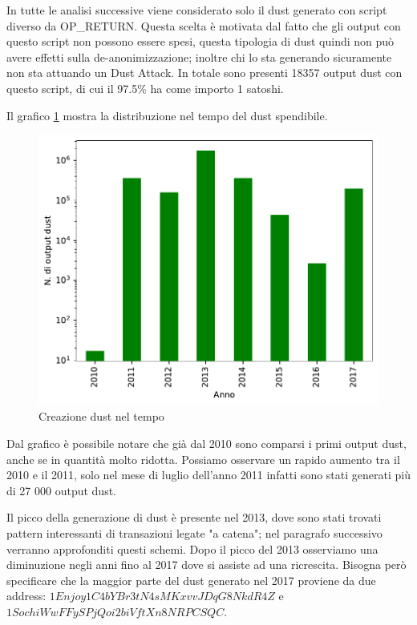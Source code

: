 In tutte le analisi successive viene considerato solo il dust generato con script diverso da OP\_RETURN. Questa scelta è motivata dal fatto che gli output con questo script non possono essere spesi, questa tipologia di dust quindi non può avere effetti sulla de-anonimizzazione; inoltre chi lo sta generando sicuramente non sta attuando un Dust Attack. In totale sono presenti 18357 output dust con questo script, di cui il 97.5\% ha come importo 1 satoshi.

Il grafico \ref{fig:dust_created} mostra la distribuzione nel tempo del dust spendibile.
\begin{figure}[h!]
    \centering
    \includegraphics[scale=0.9]{Grafici/dust_created_year.pdf}
    \caption{Creazione dust nel tempo}
    \label{fig:dust_created}
\end{figure}
\FloatBarrier 
Dal grafico è possibile notare che già dal 2010 sono comparsi i primi output dust, anche se in quantità molto ridotta. Possiamo osservare un rapido aumento tra il 2010 e il 2011, solo nel mese di luglio dell'anno 2011 infatti sono stati generati più di 27 000 output dust.

Il picco della generazione di dust è presente nel 2013, dove sono stati trovati pattern interessanti di transazioni legate "a catena"; nel paragrafo successivo verranno approfonditi questi schemi. Dopo il picco del 2013 osserviamo una diminuzione negli anni fino al 2017 dove si assiste ad una ricrescita. Bisogna però specificare che la maggior parte del dust generato nel 2017 proviene da due address: $1Enjoy1C4bYBr3tN4sMKxvvJDqG8NkdR4Z$ e $1SochiWwFFySPjQoi2biVftXn8NRPCSQC$.

